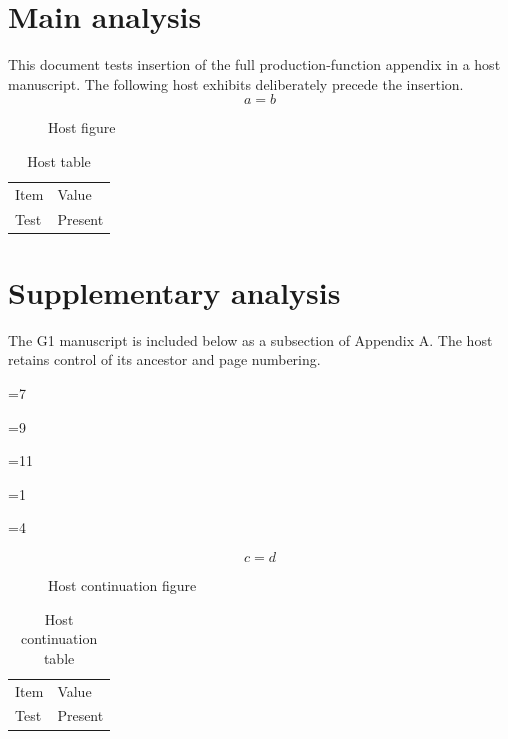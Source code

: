 \documentclass[11pt,letterpaper]{article}
\begin{document}
\section{Main analysis}
\label{host:main}
This document tests insertion of the full production-function appendix in a host manuscript. The following host exhibits deliberately precede the insertion.
\begin{equation}a=b\label{host:before-eq}\end{equation}
\begin{figure}[H]\centering{}\caption{Host figure}\label{host:before-fig}\end{figure}
\begin{table}[H]\centering\caption{Host table}\label{host:before-tab}\begin{tabular}{ll}Item&Value\\Test&Present\end{tabular}\end{table}
\setcounter{figure}{7}\setcounter{table}{9}\setcounter{equation}{11}
\appendix
\section{Supplementary analysis}
\label{host:appendix-a}
The G1 manuscript is included below as a subsection of Appendix A. The host retains control of its ancestor and page numbering.
\renewcommand{\GOneRootLevel}{2}
\makeatletter
\let\GOneTestSavedLongtableOutput\LT@output
\makeatother

\makeatletter
\ifx\GOneTestSavedLongtableOutput\LT@output
\else\PackageError{host-test}{Longtable output routine not restored}{}\fi
\makeatother
\ifnum\value{figure}=7\else\PackageError{host-test}{Figure counter not restored}{}\fi
\ifnum\value{table}=9\else\PackageError{host-test}{Table counter not restored}{}\fi
\ifnum\value{equation}=11\else\PackageError{host-test}{Equation counter not restored}{}\fi
\ifnum\value{section}=1\else\PackageError{host-test}{Ancestor section changed}{}\fi
\ifnum\value{secnumdepth}=4\else\PackageError{host-test}{Heading depth not restored}{}\fi
\begin{equation}c=d\label{host:after-eq}\end{equation}
\begin{figure}[H]\centering{}\caption{Host continuation figure}\label{host:after-fig}\end{figure}
\begin{table}[H]\centering\caption{Host continuation table}\label{host:after-tab}\begin{tabular}{ll}Item&Value\\Test&Present\end{tabular}\end{table}
\end{document}
